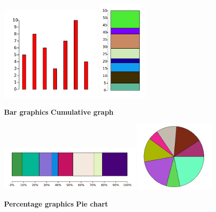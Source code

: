 \documentclass[11pt,class=report,crop=false]{standalone}
\begin{document}
\begin{activite}[Graphics]


\begin{center}
\includegraphics[scale=\myscale,width=5cm]{screen-stat-2a}\qquad\qquad
\includegraphics[scale=\myscale,height=5cm]{screen-stat-2b}

\qquad\qquad\textbf{Bar graphics}\qquad\qquad\qquad\quad
\textbf{Cumulative graph}
\end{center}

\begin{center}
\includegraphics[scale=\myscale,width=7cm]{screen-stat-2c}\qquad\qquad
\includegraphics[scale=\myscale,width=4cm]{screen-stat-2d}

\qquad\textbf{Percentage graphics}\qquad\qquad\qquad\qquad\qquad\qquad
\textbf{Pie chart}
\end{center}


\end{activite}
\end{document}
